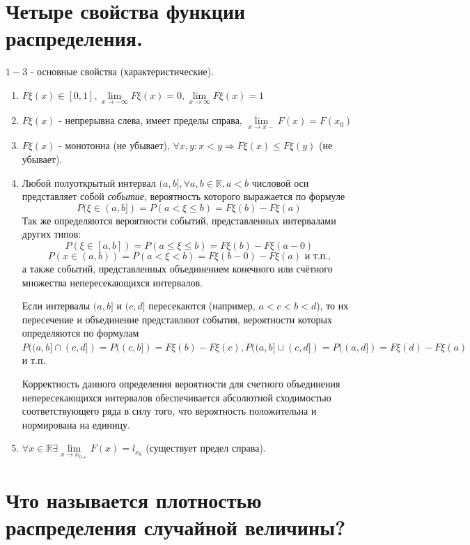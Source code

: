\section{Четыре свойства функции распределения.}

\noindent $1-3$ - основные свойства (характеристические).

\begin{enumerate}
	\item $F\xi (x) \in [0, 1], \lim\limits_{x \to - \infty} F\xi (x) = 0, \lim\limits_{x \to \infty} F\xi (x) = 1$
	\item $F\xi (x)$ - непрерывна слева, имеет пределы справа, $\lim\limits_{x \to x-} F(x) = F(x_0)$
	\item $F\xi (x)$ - монотонна (не убывает), $\forall x, y : x < y \Rightarrow F\xi (x) \le F\xi (y)$ (не убывает).
	\item Любой полуоткрытый интервал $(a, b], \forall a, b \in \mathbb{R}, a < b$ числовой оси представляет собой \textit{событие}, вероятность которого выражается по формуле
	\[ P(\xi \in (a, b]) = P(a < \xi \le b) = F\xi (b) - F\xi (a) \]
	Так же определяются вероятности событий, представленных интервалами других типов:
	\[ P(\xi \in [a, b]) = P(a \le \xi \le b) = F\xi (b) - F\xi (a - 0) \]
	\[ P(x \in (a, b)) = P(a < \xi < b) = F\xi (b - 0) - F\xi (a) \text{ и т.п.,} \]
	а также событий, представленных объединением конечного или счётного множества непересекающихся интервалов.
	
	Если интервалы $(a, b]$ и $(c, d]$ пересекаются (например, $a < c < b < d$), то их пересечение и объединение представляют события, вероятности которых определяются по формулам $P((a, b] \cap (c, d]) = P((c, b]) = F\xi (b) - F\xi (c), P((a, b] \cup (c, d]) = P((a, d]) = F\xi (d) - F\xi (a)$ и т.п.
	
	Корректность данного определения вероятности для счетного объединения непересекающихся
	интервалов обеспечивается абсолютной сходимостью соответствующего ряда в силу того, что вероятность положительна и нормирована на единицу.
	\item $\forall x \in \mathbb{R} \exists \lim\limits_{x \to x_{0+}} F(x) = l_{x_0}$ (существует предел справа).
\end{enumerate}

\section{Что называется плотностью распределения случайной величины?}


